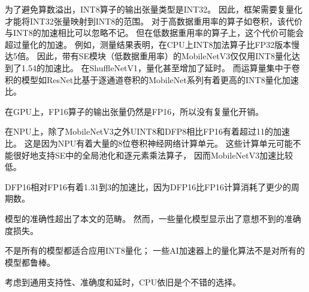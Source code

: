 为了避免算数溢出，INT8算子的输出张量类型是INT32。
因此，框架需要复量化才能将INT32张量映射到INT8\cite{krishnamoorthi2018quantizing}的范围。
对于高数据重用率的算子如卷积，该代价与INT8的加速相比可以忽略不记。
但在低数据重用率的算子上，这个代价可能会超过量化的加速。
例如，测量结果表明，在CPU上INT8加法算子比FP32版本慢达5倍。
因此，带有SE模块（低数据重用率）的MobileNetV3仅仅用INT8量化达到了1.54的加速比。
在ShuffleNetV1，量化甚至增加了延时。
而运算量集中于卷积的模型如ResNet比基于逐通道卷积的MobileNet系列有着更高的INT8量化加速比。

在GPU上，FP16算子的输出张量仍然是FP16，所以没有复量化开销。

在NPU上，除了MobileNetV3之外UINT8和DFP8相比FP16有着超过11的加速比。
这是因为NPU有着大量的8位卷积神经网络计算单元。
这些计算单元可能不能很好地支持SE中的全局池化和逐元素乘法算子，
因而MobileNetV3加速比较低。

DFP16相对FP16有着1.31到3的加速比，因为DFP16比FP16计算消耗了更少的周期数。

模型的准确性超出了本文的范畴。
然而，一些量化模型显示出了意想不到的准确度损失。

\begin{finding}
    不是所有的模型都适合应用INT8量化；
    一些AI加速器上的量化算法不是对所有的模型都鲁棒。
\end{finding}

\begin{finding}
    考虑到通用支持性、准确度和延时，CPU依旧是个不错的选择。
\end{finding}
